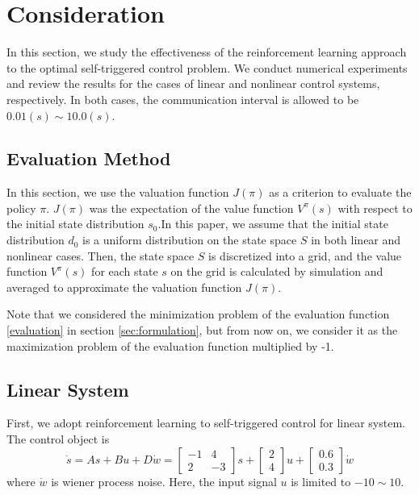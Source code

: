 \documentclass[english, dvipdfmx]{ampmt}             %
\begin{document}
\section{Consideration}
In this section, we study the effectiveness of the reinforcement learning approach to the optimal self-triggered control problem. We conduct numerical experiments and review the results for the cases of linear and nonlinear control systems, respectively. In both cases, the communication interval is allowed to be $0.01 (s) \sim 10.0 (s)$. 

\subsection{Evaluation Method}
In this section, we use the valuation function $J(\pi)$ as a criterion to evaluate the policy $\pi$. $J(\pi)$ was the expectation of the value function $V^{\pi}(s)$ with respect to the initial state distribution $s_0$.In this paper, we assume that the initial state distribution $d_0$ is a uniform distribution on the state space $S$ in both linear and nonlinear cases. Then, the state space $S$ is discretized into a grid, and the value function $V^{\pi}(s)$ for each state $s$ on the grid is calculated by simulation and averaged to approximate the valuation function $J(\pi)$. \par
Note that we considered the minimization problem of the evaluation function \ref{evaluation} in section \ref{sec:formulation}, but from now on, we consider it as the maximization problem of the evaluation function multiplied by -1.

\subsection{Linear System}
First, we adopt reinforcement learning to self-triggered control for linear system. The control object is
\begin{equation}
	\dot{s} = As + Bu + D\dot{w}= \begin{bmatrix}-1& 4 \\ 2 & -3\end{bmatrix}s + \begin{bmatrix}2 \\ 4\end{bmatrix}u + \begin{bmatrix}0.6 \\ 0.3\end{bmatrix}\dot{w}
\end{equation}
where $\dot{w}$ is wiener process noise. Here, the input signal $u$ is limited to $-10 \sim 10$.
\end{document}
